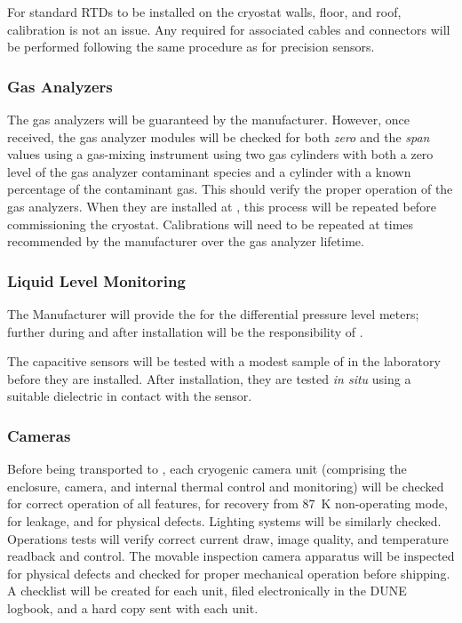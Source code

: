 For standard RTDs to be installed on the cryostat walls, floor, and roof, calibration is not an issue. Any  required for associated cables and connectors will be performed following the same procedure as for precision sensors. 

\subsubsection{Gas Analyzers}
\label{sec:fdgen-slow-cryo-qc-ga}

The gas analyzers will be guaranteed by the manufacturer. However, once received, the gas analyzer modules will be checked for both \textit{zero} and the \textit{span} values using a gas-mixing instrument using two gas cylinders  with both a zero level of the gas analyzer contaminant species and a cylinder with a known percentage of the contaminant gas. This should verify the proper operation of the gas analyzers. When they are installed at \surf, this process will be repeated before commissioning the cryostat. Calibrations will need to be repeated at times recommended by the manufacturer over the gas analyzer lifetime.


\subsubsection{Liquid Level Monitoring}
\label{sec:fdgen-slow-cryo-qc-llm}

The Manufacturer will provide the  for the differential pressure level meters; further  during and after installation will be the responsibility of .

The capacitive sensors will be tested with a modest sample of \lar in the laboratory before they are installed. After installation, they are tested {\em in situ} using a suitable dielectric in contact with the sensor.

\subsubsection{Cameras}
\label{sec:fdgen-slow-cryo-qc-c}

Before being transported to \surf, each cryogenic camera unit (comprising the enclosure, camera, and internal thermal control and monitoring) will be checked for correct operation of all features, for recovery from \SI{87}{K} non-operating mode, for leakage, and for physical defects. Lighting systems will be similarly checked. Operations tests will verify correct current draw, image quality, and temperature readback and control. The movable inspection camera apparatus will be inspected for physical defects and checked for proper mechanical operation before shipping. A checklist will be created for each unit, filed electronically in the DUNE logbook, and a hard copy sent with each unit. 

